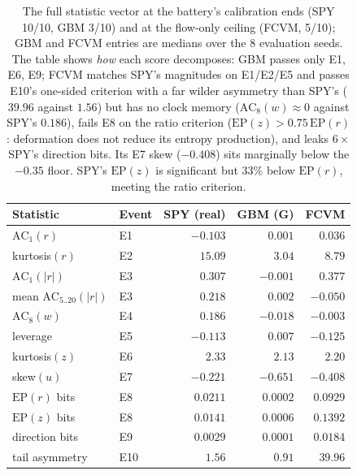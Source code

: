 \documentclass[11pt]{article}
\newcommand{\cfg}[1]{\mbox{#1}}
\begin{document}
\begin{table}[t]
\centering\small
\begin{tabular}{llrrr}
\toprule
Statistic & Event & SPY (real) & GBM (G) & \cfg{FCVM} \\
\midrule
$\mathrm{AC}_1(r)$            & E1  & $-0.103$ & $0.001$  & $0.036$ \\
kurtosis$(r)$                 & E2  & $15.09$  & $3.04$   & $8.79$ \\
$\mathrm{AC}_1(|r|)$          & E3  & $0.307$  & $-0.001$ & $0.377$ \\
mean $\mathrm{AC}_{5..20}(|r|)$ & E3 & $0.218$  & $0.002$  & $-0.050$ \\
$\mathrm{AC}_8(w)$            & E4  & $0.186$  & $-0.018$ & $-0.003$ \\
leverage                      & E5  & $-0.113$ & $0.007$  & $-0.125$ \\
kurtosis$(z)$                 & E6  & $2.33$   & $2.13$   & $2.20$ \\
skew$(u)$                     & E7  & $-0.221$ & $-0.651$ & $-0.408$ \\
$\mathrm{EP}(r)$ bits         & E8  & $0.0211$ & $0.0002$ & $0.0929$ \\
$\mathrm{EP}(z)$ bits         & E8  & $0.0141$ & $0.0006$ & $0.1392$ \\
direction bits                & E9  & $0.0029$ & $0.0001$ & $0.0184$ \\
tail asymmetry                & E10 & $1.56$   & $0.91$   & $39.96$ \\
\bottomrule
\end{tabular}
\caption{The full statistic vector at the battery's calibration ends (SPY
10/10, GBM 3/10) and at the flow-only ceiling (\cfg{FCVM}, 5/10); GBM and
\cfg{FCVM} entries are medians over the 8 evaluation seeds. The table shows
\emph{how} each score decomposes: GBM passes only E1, E6, E9; \cfg{FCVM}
matches SPY's magnitudes on E1/E2/E5 and passes E10's one-sided
criterion with a far wilder asymmetry than SPY's ($39.96$ against
$1.56$) but has no clock memory
($\mathrm{AC}_8(w)\approx 0$ against SPY's $0.186$), fails E8 on the ratio
criterion ($\mathrm{EP}(z) > 0.75\,\mathrm{EP}(r)$: deformation does not
reduce its entropy production), and leaks $6\times$ SPY's direction bits.
Its E7 skew ($-0.408$) sits marginally below the $-0.35$ floor. SPY's
$\mathrm{EP}(z)$ is significant but 33\% below $\mathrm{EP}(r)$, meeting the
ratio criterion.}
\label{tab:calib}
\end{table}
\end{document}
